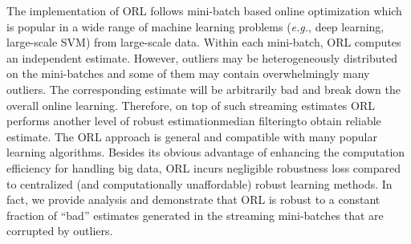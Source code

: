 \documentclass[11pt]{article}
\begin{document}
The implementation of ORL follows mini-batch based online optimization  which is popular in a wide range of machine learning problems (\emph{e.g.}, deep learning, large-scale SVM) from large-scale data.  Within each mini-batch, ORL computes an independent  estimate. However,   outliers may be heterogeneously distributed on the mini-batches and some of them may contain overwhelmingly many outliers. The corresponding estimate will be arbitrarily bad and break down the overall online learning. Therefore, on top of such streaming estimates  ORL performs another level of robust estimation\textemdash median filtering\textemdash to obtain reliable estimate.  The ORL approach is general and compatible with many  popular  learning algorithms.
Besides its obvious advantage of enhancing the computation efficiency for handling big data,  ORL incurs negligible robustness loss compared to  centralized (and computationally unaffordable) robust learning methods. In fact, we provide  analysis and demonstrate that ORL is robust to a constant fraction of ``bad'' estimates generated in the streaming mini-batches that are corrupted by outliers.

\end{document}
